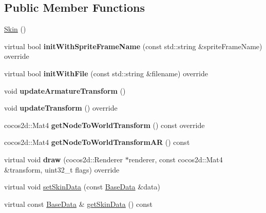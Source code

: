 \subsection*{Public Member Functions}
\begin{DoxyCompactItemize}
\item 
\hyperlink{classcocostudio_1_1Skin_a1df1a70d607e83c3494408ae4a2b0698}{Skin} ()
\item 
\mbox{\label{classcocostudio_1_1Skin_ad08eafeb22627c8fa5f9a681ca66a272}} 
virtual bool {\bfseries init\+With\+Sprite\+Frame\+Name} (const std\+::string \&sprite\+Frame\+Name) override
\item 
\mbox{\label{classcocostudio_1_1Skin_a443885cb4849016dfdafd81746d6257c}} 
virtual bool {\bfseries init\+With\+File} (const std\+::string \&filename) override
\item 
\mbox{\label{classcocostudio_1_1Skin_aa46d0e73147e6158153aa2a705ec869b}} 
void {\bfseries update\+Armature\+Transform} ()
\item 
\mbox{\label{classcocostudio_1_1Skin_a1fd4c292f0146e470e59c84a03c035c0}} 
void {\bfseries update\+Transform} () override
\item 
\mbox{\label{classcocostudio_1_1Skin_a7d73fcbb11ab993a216d2369251b4a0b}} 
cocos2d\+::\+Mat4 {\bfseries get\+Node\+To\+World\+Transform} () const override
\item 
\mbox{\label{classcocostudio_1_1Skin_a161ba20d90d2dfc153d688d532e1821d}} 
cocos2d\+::\+Mat4 {\bfseries get\+Node\+To\+World\+Transform\+AR} () const
\item 
\mbox{\label{classcocostudio_1_1Skin_ae98cafc152e0c2c6007b2a873f9bb4de}} 
virtual void {\bfseries draw} (cocos2d\+::\+Renderer $\ast$renderer, const cocos2d\+::\+Mat4 \&transform, uint32\+\_\+t flags) override
\item 
virtual void \hyperlink{classcocostudio_1_1Skin_ae04aa81da673975be6a2973024a1ac46}{set\+Skin\+Data} (const \hyperlink{classcocostudio_1_1BaseData}{Base\+Data} \&data)
\item 
virtual const \hyperlink{classcocostudio_1_1BaseData}{Base\+Data} \& \hyperlink{classcocostudio_1_1Skin_a3867d7e8ce90e2f1aa9addbf8706e579}{get\+Skin\+Data} () const

\end{DoxyCompactItemize}
